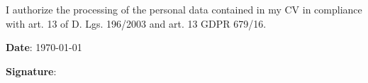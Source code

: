 \begin{cvparagraph}
    \begin{center}
        I authorize the processing of the personal data contained in my CV in compliance with art. 13 of D. Lgs. 196/2003 and art. 13 GDPR 679/16.
    \end{center}
    
\end{cvparagraph}
\begin{cvparagraph}
\begin{minipage}{0.5\textwidth}
\textbf{Date}: \today
\end{minipage} 
\begin{minipage}{0.5\textwidth}
\textbf{Signature}:
\end{minipage}
\end{cvparagraph}
